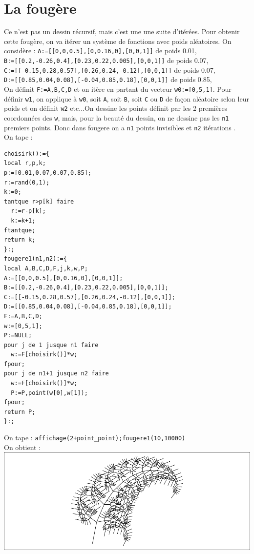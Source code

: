 \documentclass[a4paper,11pt]{book}
\begin{document}
\section{La foug\`ere}
Ce n'est pas un dessin r\'ecursif, mais c'est une une suite d'it\'er\'ees. 
Pour obtenir cette foug\`ere, on va it\'erer un syst\`eme de fonctions avec 
poids al\'eatoires.
On consid\`ere :
{\tt A:=[[0,0,0.5],[0,0.16,0],[0,0,1]]} de poids 0.01,\\
{\tt B:=[[0.2,-0.26,0.4],[0.23,0.22,0.005],[0,0,1]]} de poids 0.07,\\
{\tt C:=[[-0.15,0.28,0.57],[0.26,0.24,-0.12],[0,0,1]]} de poids 0.07,\\
{\tt D:=[[0.85,0.04,0.08],[-0.04,0.85,0.18],[0,0,1]]} de poids 0.85,\\
On d\'efinit {\tt F:=A,B,C,D} et on it\`ere en partant du vecteur 
{\tt w0:=[0,5,1]}. Pour d\'efinir {\tt w1}, on applique \`a {\tt w0}, soit 
{\tt A}, soit {\tt B}, soit {\tt C} ou {\tt D} de fa\c{c}on al\'eatoire selon 
leur poids et on d\'efinit {\tt w2} etc...On dessine les points d\'efinit par 
les 2 premi\`eres coordonn\'ees des {\tt w}, mais, pour la beaut\'e du dessin, 
on ne dessine pas les {\tt n1} premiers points. Donc dans fougere on a {\tt n1}
points invisibles et {\tt n2} it\'erations .\\
On tape :
\begin{verbatim}
choisirk():={
local r,p,k;
p:=[0.01,0.07,0.07,0.85];
r:=rand(0,1);
k:=0;
tantque r>p[k] faire 
  r:=r-p[k];
  k:=k+1;
ftantque;
return k;
}:;
fougere1(n1,n2):={
local A,B,C,D,F,j,k,w,P;
A:=[[0,0,0.5],[0,0.16,0],[0,0,1]];
B:=[[0.2,-0.26,0.4],[0.23,0.22,0.005],[0,0,1]];
C:=[[-0.15,0.28,0.57],[0.26,0.24,-0.12],[0,0,1]];
D:=[[0.85,0.04,0.08],[-0.04,0.85,0.18],[0,0,1]];
F:=A,B,C,D;
w:=[0,5,1];
P:=NULL;
pour j de 1 jusque n1 faire
  w:=F[choisirk()]*w;
fpour;
pour j de n1+1 jusque n2 faire
  w:=F[choisirk()]*w;
  P:=P,point(w[0],w[1]);
fpour;
return P;
}:;
\end{verbatim}  
On tape :
{\tt affichage(2+point\_point);fougere1(10,10000)}\\
On obtient :\\

\includegraphics[width=\textwidth]{fougere1}
\end{document}

